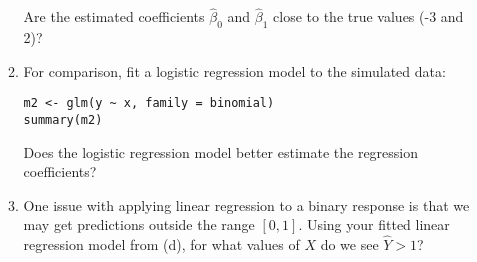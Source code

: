 \documentclass[11pt]{article}
\begin{document}
\begin{enumerate}
\begin{enumerate}
Are the estimated coefficients $\widehat{\beta}_0$ and $\widehat{\beta}_1$ close to the true values (-3 and 2)?

\item For comparison, fit a logistic regression model to the simulated data:

\begin{verbatim}
m2 <- glm(y ~ x, family = binomial) 
summary(m2)
\end{verbatim}

Does the logistic regression model better estimate the regression coefficients?

\item One issue with applying linear regression to a binary response is that we may get predictions outside the range $[0, 1]$. Using your fitted linear regression model from (d), for what values of $X$ do we see $\widehat{Y} > 1$?

\end{enumerate}

\end{enumerate}
\end{document}
